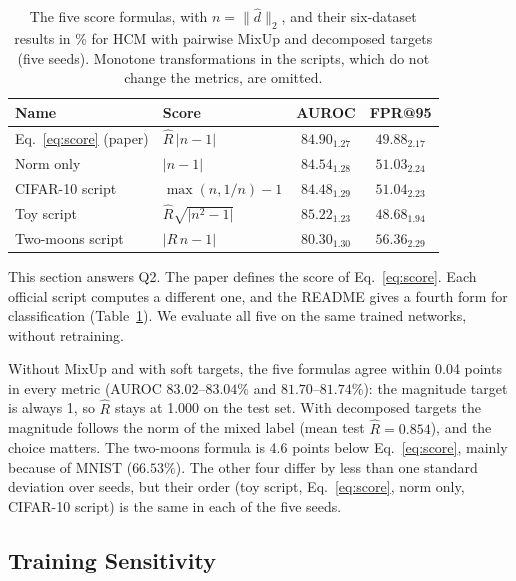 \documentclass[letterpaper]{article} %
\begin{document}
\begin{table}[t]
  \centering
  \small
  \setlength{\tabcolsep}{1mm}
  \begin{tabular}{@{}llcc@{}}
    \toprule
    Name & Score & AUROC & FPR@95 \\
    \midrule
    Eq.~\eqref{eq:score} (paper) & $\hat R\,\lvert n-1\rvert$ & $84.90_{1.27}$ & $49.88_{2.17}$ \\
    Norm only  &$\lvert n-1\rvert$ & $84.54_{1.28}$ & $51.03_{2.24}$ \\
    CIFAR-10 script     & $\max(n,1/n)-1$ & $84.48_{1.29}$ & $51.04_{2.23}$ \\
    Toy script          & $\hat R\sqrt{\lvert n^2-1\rvert}$ & $\mathbf{85.22}_{1.23}$ & $\mathbf{48.68}_{1.94}$ \\
    Two-moons script    & $\lvert\hat R\,n-1\rvert$ & $80.30_{1.30}$ & $56.36_{2.29}$ \\
    \bottomrule
  \end{tabular}
  \caption{The five score formulas, with $n=\lVert\hat d\rVert_2$, and their six-dataset results in \% for HCM with pairwise MixUp and decomposed targets (five seeds). Monotone transformations in the scripts, which do not change the metrics, are omitted.}
  \label{tab:score_formulas}
\end{table}

This section answers Q2. The paper defines the score of Eq.~\eqref{eq:score}. Each official script computes a different one, and the README gives a fourth form for classification (Table~\ref{tab:score_formulas}). We evaluate all five on the same trained networks, without retraining.

Without MixUp and with soft targets, the five formulas agree within 0.04 points in every metric (AUROC $83.02$--$83.04\%$ and $81.70$--$81.74\%$): the magnitude target is always 1, so $\hat R$ stays at 1.000 on the test set. With decomposed targets the magnitude follows the norm of the mixed label (mean test $\hat R=0.854$), and the choice matters. The two-moons formula is 4.6 points below Eq.~\eqref{eq:score}, mainly because of MNIST ($66.53\%$). The other four differ by less than one standard deviation over seeds, but their order (toy script, Eq.~\eqref{eq:score}, norm only, CIFAR-10 script) is the same in each of the five seeds.

\subsection{Training Sensitivity}
\label{sec:cifar-sensitivity}
\end{document}
